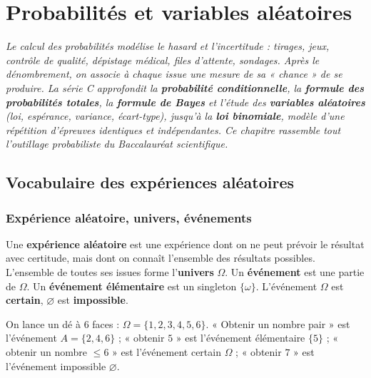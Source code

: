 \chapter{Probabilités et variables aléatoires}

\noindent\textit{Le calcul des probabilités modélise le hasard et l'incertitude :
tirages, jeux, contrôle de qualité, dépistage médical, files d'attente, sondages.
Après le dénombrement, on associe à chaque issue une mesure de sa « chance » de se
produire. La série C approfondit la \textbf{probabilité conditionnelle}, la
\textbf{formule des probabilités totales}, la \textbf{formule de Bayes} et l'étude
des \textbf{variables aléatoires} (loi, espérance, variance, écart-type), jusqu'à
la \textbf{loi binomiale}, modèle d'une répétition d'épreuves identiques et
indépendantes. Ce chapitre rassemble tout l'outillage probabiliste du
Baccalauréat scientifique.}
\vspace{8pt}

\section{Vocabulaire des expériences aléatoires}

\subsection{Expérience aléatoire, univers, événements}

\begin{definition}
Une \textbf{expérience aléatoire} est une expérience dont on ne peut prévoir le
résultat avec certitude, mais dont on connaît l'ensemble des résultats possibles.
L'ensemble de toutes ses issues forme l'\textbf{univers} $\Omega$. Un
\textbf{événement} est une partie de $\Omega$. Un \textbf{événement élémentaire}
est un singleton $\{\omega\}$. L'événement $\Omega$ est \textbf{certain},
$\varnothing$ est \textbf{impossible}.
\end{definition}

\begin{exemple}
On lance un dé à $6$ faces : $\Omega=\{1,2,3,4,5,6\}$. « Obtenir un nombre pair »
est l'événement $A=\{2,4,6\}$ ; « obtenir $5$ » est l'événement élémentaire
$\{5\}$ ; « obtenir un nombre $\le 6$ » est l'événement certain $\Omega$ ;
« obtenir $7$ » est l'événement impossible $\varnothing$.
\end{exemple}

